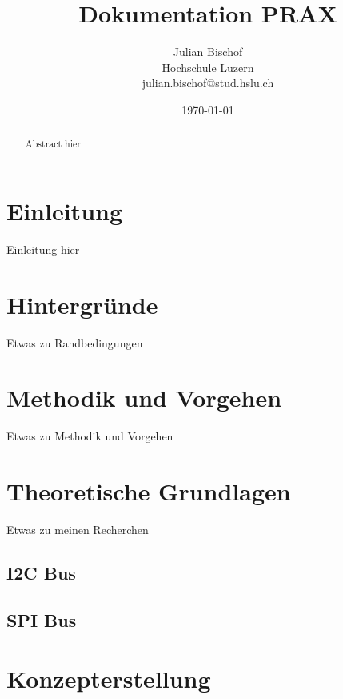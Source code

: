 \documentclass[]{article}
\title{Dokumentation PRAX\textunderscore6}
\author{Julian Bischof \\
        Hochschule Luzern \\
        julian.bischof@stud.hslu.ch}
\date{\today}
\begin{document}

\maketitle 
\thispagestyle{empty}

\newpage
\thispagestyle{empty}
\begin{abstract}
    Abstract hier
\end{abstract}
\newpage

\tableofcontents %
\listoffigures %
\listoftables %
\clearpage
\setcounter{page}{0}

\section{Einleitung}

Einleitung hier

\section{Hintergründe}

Etwas zu Randbedingungen

\section{Methodik und Vorgehen}

Etwas zu Methodik und Vorgehen

\section{Theoretische Grundlagen}

Etwas zu meinen Recherchen
\subsection{I2C Bus}
\subsection{SPI Bus}

\section{Konzepterstellung}
\end{document}
